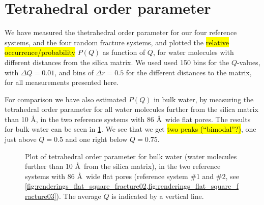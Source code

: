 \section{Tetrahedral order parameter}
%
%

We have measured the thetrahedral order parameter for our four reference systems, and the four random fracture systems, and plotted the \hl{relative occurrence/probability} $P(Q)$ as function of $Q$, for water molecules with different distances from the silica matrix. We used used 150 bins for the $Q$-values, with $\Delta Q = 0.01$, and bins of $\Delta r = 0.5$ for the different distances to the matrix, for all measurements presented here.

For comparison we have also estimated $P(Q)$ in bulk water, by measuring the tetrahedral order parameter for all water molecules further from the silica matrix than 10 \AA, in the two reference systems with 86 \AA\ wide flat pores. The results for bulk water can be seen in \cref{fig:top_bulk}. We see that we get \hl{two peaks (``bimodal''?)}, one just above $Q = 0.5$ and one right below $Q = 0.75$. 
%
\begin{figure}[htpb]%
    \centering%
    \caption{%
        Plot of tetrahedral order parameter for bulk water (water molecules further than 10 \AA\ from the silica matrix), in the two reference systems with 86 \AA\ wide flat pores (reference system \#1 and \#2, see \cref{fig:renderings_flat_square_fracture02,fig:renderings_flat_square_fracture03}). The average $Q$ is indicated by a vertical line. %
    }%
    \label{fig:top_bulk}%
\end{figure}%

